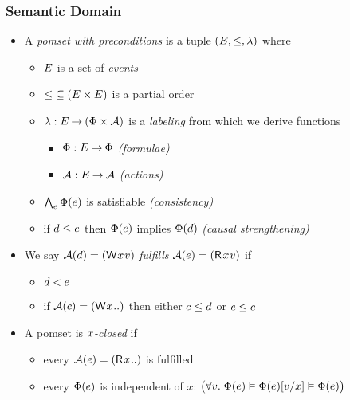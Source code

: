 \documentclass[t,aspectratio=169]{beamer} %
\begin{document}
\begin{frame}
  \frametitle{Semantic Domain}
  \begin{itemize}
  \item 
    A \emph{pomset with preconditions} is a tuple
    $(\Event, {\le}, %
    \labeling)$ where
    \begin{itemize}
    \item $E$ is a set of \emph{events}
    \item ${\le} \subseteq (E\times E)$ is a partial order
    \item<+-> $\lambda: E \mathbin\rightarrow (\Phi\times\mathcal{A})$ is a \emph{labeling}
      from which we derive functions
      \begin{itemize}
      \item $\Phi:E\mathbin\rightarrow\Phi$ \emph{(formulae)} %
      \item $\mathcal{A}:E\mathbin\rightarrow\mathcal{A}$  \emph{(actions)} %
      \end{itemize}
    \item<+-> $\bigwedge_{e}\Phi(e)$ is satisfiable
      \emph{(consistency)}
    \item<+-> if $d\le e$ then $\Phi(e)$ implies
      $\Phi(d)$ \emph{(causal strengthening)}
    \end{itemize}
  \item<+->
    We say $\labelingAct(\bEv)=(\DW{x}{v})$ \emph{fulfills} $\labelingAct(\aEv)=(\DR{x}{v})$ if 
    \begin{itemize}
    \item%
      $d < e$
    \item<+->%
      if $\labelingAct(\cEv)=(\DW{x}{..})$ then either $c \le d$ or $e \le c$
    \end{itemize}
  \item<+->
    A pomset is \emph{$x$-closed} if
    \begin{itemize}
    \item every $\labelingAct(\aEv)=(\DR{\aLoc}{..})$ is fulfilled
    \item<+-> every $\Phi(e)$ is independent of $x$: $\bigl(\forall v.\;\Phi(e) \vDash \Phi(e)[v/x] \vDash
      \Phi(e)\bigr)$
    \end{itemize}
  \end{itemize}
\end{frame}
\end{document}
